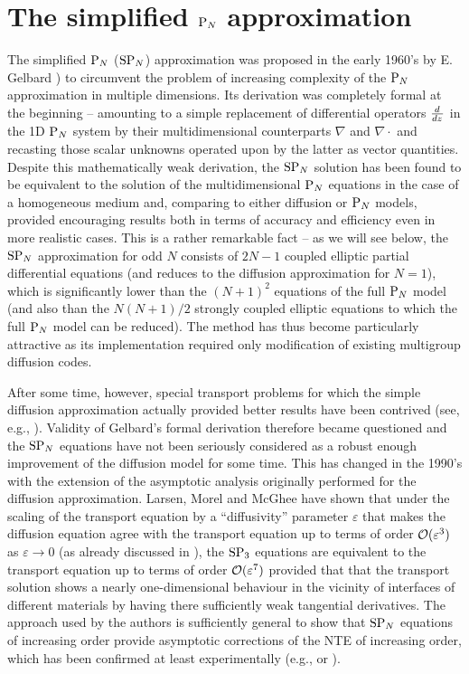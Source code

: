 \chapter{The simplified $\PN$ approximation}\label{chap:SPN}
The simplified $\PN$ ($\SPN$) approximation was proposed in the early 1960's by E. Gelbard \cite{Gelbard1,Gelbard2}) to
circumvent the problem of increasing complexity of the $\PN$ approximation in multiple dimensions. Its derivation was
completely formal at the beginning -- amounting to a simple replacement of differential operators $\textstyle\der{}{z}$
in the 1D $\PN$ system by their multidimensional counterparts $\nabla$ and $\nabla\cdot$ and recasting those scalar
unknowns operated upon by the latter as vector quantities.
Despite this mathematically weak derivation, the $\SPN$ solution has been found to be equivalent to the solution of the
multidimensional $\PN$ equations in the case of a homogeneous medium and, comparing to either diffusion or $\PN$ models,
provided encouraging results both in terms of accuracy and efficiency even in more realistic cases. This is a rather
remarkable fact -- as we will see below, the $\SPN$ approximation for odd $N$ consists of $2N-1$ coupled elliptic
partial differential equations (and reduces to the diffusion approximation for $N = 1$), which is significantly lower
than the $(N+1)^2$ equations of the full $\PN$ model (and also than the $N(N+1)/2$ strongly coupled elliptic equations
to which the full $\PN$ model can be reduced). The method has thus become particularly attractive as its implementation
required only modification of existing multigroup diffusion codes.

After some time, however, special transport problems for which the simple diffusion
approximation actually provided better results have been contrived (see, e.g., \cite[p. 247]{Coppa1}). Validity of
Gelbard's formal derivation therefore became questioned and the $\SPN$ equations have not been seriously considered as 
a robust enough improvement of the diffusion model for some time. This has changed in the 1990's with the extension of
the asymptotic analysis originally performed for the diffusion approximation. Larsen, Morel and McGhee
\cite{Larsen1} have shown that under the scaling of the transport equation by a ``diffusivity'' parameter $\varepsilon$
that makes the diffusion equation agree with the transport equation up to terms of order $\Oh(\varepsilon^3)$ as 
$\varepsilon \to 0$ (as already discussed in ), the $\SPN[3]$ equations are
equivalent to the transport equation up to terms of order $\Oh(\varepsilon^7)$ provided that that the transport solution shows a nearly 
one-dimensional behaviour in the vicinity of interfaces of different materials by having there sufficiently weak
tangential derivatives. The approach used by the authors is sufficiently general to show
that $\SPN$ equations of increasing order provide asymptotic corrections of the NTE of increasing order, which has been
confirmed at least experimentally (e.g., \cite{Olbrant} or \cite{McClarren1}).


